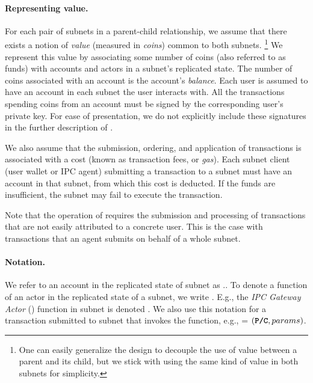 \paragraph{Representing value.}
For each pair of subnets in a parent-child relationship, we assume that there exists a notion of \emph{value} (measured in \emph{\glspl{coin}}) common to both subnets.%
\footnote{One can easily generalize the design to decouple the use of value between a parent and its child, but we stick with using the same kind of value in both subnets for simplicity.}
We represent this value by associating some number of coins (also referred to as funds) with \glspl{account} and actors in a subnet's replicated state.
The number of coins associated with an account is the account's \emph{\gls{balance}}.
Each user is assumed to have an account in each subnet the user interacts with.
All the transactions spending coins from an account must be signed by the corresponding user's private key.
For ease of presentation, we do not explicitly include these signatures in the further description of \ipc.

We also assume that the submission, ordering, and application of transactions is associated with a cost (known as transaction fees, or \emph{gas}).
Each \gls{subnet client} (user \gls{wallet} or IPC agent) submitting a transaction to a subnet must have an account in that subnet, from which this cost is deducted.
If the funds are insufficient, the subnet may fail to execute the transaction.

Note that the operation of \ipc requires the submission and processing of transactions that are not easily attributed to a concrete user.
This is the case with transactions that an \ipc agent submits on behalf of a whole subnet.

\paragraph{Notation.} We refer to an account  in the replicated state of subnet  as ..
To denote a function of an actor in the replicated state of a subnet, we write .
E.g., the \emph{IPC Gateway Actor} (\gw) function  in subnet  is denoted .
We also use this notation for a transaction  submitted to subnet  that invokes the function, e.g.,  = $(\textbf{\texttt{P/C}}, params)$.

